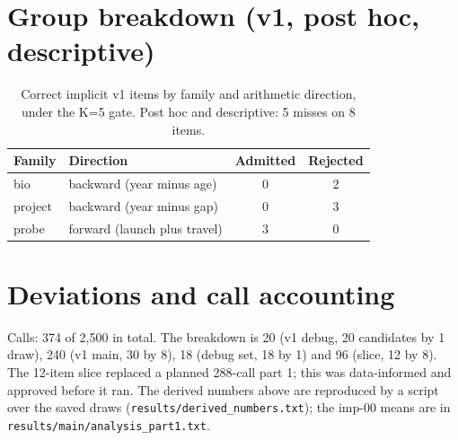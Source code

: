 \documentclass[11pt]{article}
\begin{document}
\section{Group breakdown (v1, post hoc, descriptive)}\label{app:breakdown}
\begin{table}[h]
\centering
\caption{Correct implicit v1 items by family and arithmetic direction, under the K{=}5 gate. Post hoc and descriptive: 5 misses on 8 items.}
\label{tab:breakdown}
\begin{tabular}{llcc}
\toprule
Family & Direction & Admitted & Rejected \\
\midrule
bio & backward (year minus age) & 0 & 2 \\
project & backward (year minus gap) & 0 & 3 \\
probe & forward (launch plus travel) & 3 & 0 \\
\bottomrule
\end{tabular}
\end{table}

\section{Deviations and call accounting}
Calls: 374 of 2{,}500 in total. The breakdown is 20 (v1 debug, 20 candidates by 1 draw), 240 (v1 main, 30 by 8), 18 (debug set, 18 by 1) and 96 (slice, 12 by 8). The 12-item slice replaced a planned 288-call part 1; this was data-informed and approved before it ran. The derived numbers above are reproduced by a script over the saved draws (\texttt{results/derived\_numbers.txt}); the imp-00 means are in \texttt{results/main/analysis\_part1.txt}.



\end{document}

